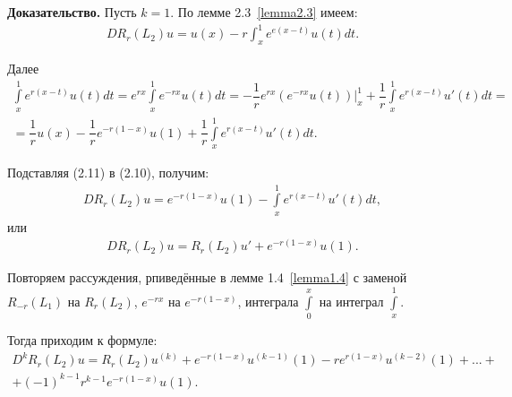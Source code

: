 \textbf{Доказательство.} Пусть $ k = 1 $. По лемме 2.3~\eqref{lemma2.3} имеем:
\begin{equation}
\begin{array}{c}

DR_r(L_2)u = u(x) - r\int_x^1 e^{e(x-t)}u(t)dt.

\end{array}
\end{equation}

Далее
\begin{equation}
\begin{array}{c}

\int\limits_x^1 e^{r(x-t)}u(t)dt = e^{rx}\int\limits_x^1 e^{-rx}u(t)dt = -\dfrac{1}{r}e^{rx}(e^{-rx}u(t))\bigg|_x^1 + \dfrac{1}{r}\int\limits_x^1 e^{r(x-t)}u'(t)dt = \\ = \dfrac{1}{r}u(x) - \dfrac{1}{r}e^{-r(1-x)}u(1) + \dfrac{1}{r}\int\limits_x^1 e^{r(x-t)}u'(t)dt.

\end{array}
\end{equation}

Подставляя (2.11) в (2.10), получим:
\begin{equation}
\begin{array}{c}
\nonumber

DR_r(L_2)u = e^{-r(1-x)}u(1) - \int\limits_x^1 e^{r(x-t)}u'(t)dt,

\end{array}
\end{equation}
или
\begin{equation}
\begin{array}{c}
\nonumber

DR_r(L_2)u = R_r(L_2)u' + e^{-r(1-x)}u(1).

\end{array}
\end{equation}

Повторяем рассуждения, рпиведённые в лемме 1.4~\eqref{lemma1.4} с заменой $ R_{-r}(L_1) $ на $ R_r(L_2) $, $ e^{-rx} $ на $ e^{-r(1-x)} $, интеграла $ \int\limits_0^x $ на интеграл $ \int\limits_x^1 $.

Тогда приходим к формуле:
\begin{equation}
\begin{array}{c}

D^kR_r(L_2)u = R_r(L_2)u^{(k)} + e^{-r(1-x)}u^{(k-1)}(1) - re^{r(1-x)}u^{(k-2)}(1) + ... + \\ + (-1)^{k-1}r^{k-1}e^{-r(1-x)}u(1).

\end{array}
\end{equation}

